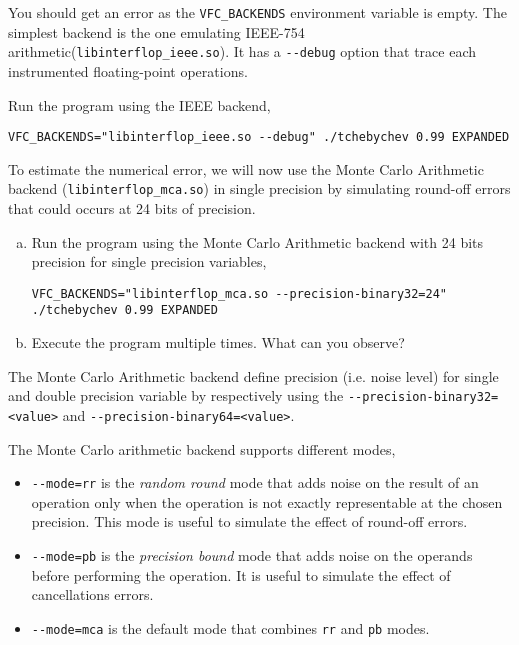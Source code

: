 You should get an error as the \texttt{VFC\_BACKENDS} environment variable is empty.
The simplest backend is the one emulating IEEE-754 arithmetic(\texttt{libinterflop\_ieee.so}).
It has a \texttt{-{}-debug} option that trace each instrumented floating-point operations.

\begin{question}
  Run the program using the IEEE backend,
  \begin{verbatim}
VFC_BACKENDS="libinterflop_ieee.so --debug" ./tchebychev 0.99 EXPANDED
\end{verbatim}
\end{question}

To estimate the numerical error, we will now use the Monte Carlo Arithmetic
backend (\texttt{libinterflop\_mca.so}) in single precision by simulating
round-off errors that could occurs at 24 bits of precision.

\begin{question}
  \begin{enumerate}[(a)]

    \item Run the program using the Monte Carlo Arithmetic backend with 24 bits
          precision for single precision variables,
          \begin{verbatim}
VFC_BACKENDS="libinterflop_mca.so --precision-binary32=24" ./tchebychev 0.99 EXPANDED
\end{verbatim}
    \item Execute the program multiple times. What can you observe?
  \end{enumerate}
\end{question}

The Monte Carlo Arithmetic backend define precision (i.e. noise level) for
single and double precision variable by respectively using the
\texttt{-{}-precision-binary32=<value>} and
\texttt{-{}-precision-binary64=<value>}.

The Monte Carlo arithmetic backend supports different modes,
\begin{itemize}

  \item \texttt{-{}-mode=rr} is the \emph{random round} mode that adds noise on the
        result of an operation only when the operation is not exactly representable
        at the chosen precision. This mode is useful to simulate the effect of
        round-off errors.

  \item \texttt{-{}-mode=pb} is the \emph{precision bound} mode that adds noise on
        the operands before performing the operation. It is useful to simulate the
        effect of cancellations errors.

  \item \texttt{-{}-mode=mca} is the default mode that combines \texttt{rr} and
        \texttt{pb} modes.

\end{itemize}

